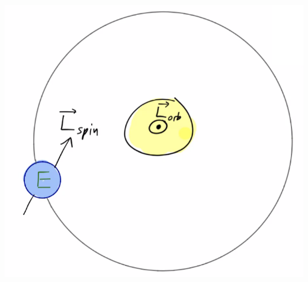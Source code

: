 \documentclass[../PHYS306Notes.tex]{subfiles}
\begin{document}
\begin{center}
    \includegraphics[scale=0.5]{Lecture-17/l17-img2.png}
\end{center}
\end{document}

